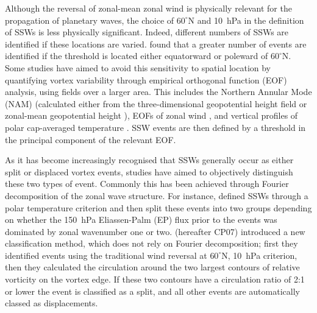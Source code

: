 Although the reversal of zonal-mean zonal wind is physically relevant for the
propagation of planetary waves, the choice of $60^{\circ}$N and 10~hPa in the
definition of SSWs is less physically significant. Indeed, different numbers of
SSWs are identified if these locations are varied. \citet{Butler2014a} found
that a greater number of events are identified if the threshold is located
either equatorward or poleward of $60^{\circ}$N. Some studies have aimed to
avoid this sensitivity to spatial location by quantifying vortex variability
through empirical orthogonal function (EOF) analysis, using fields over a larger
area. This includes the Northern Annular Mode (NAM) (calculated either from the
three-dimensional geopotential height field \citep{Baldwin2001a} or zonal-mean
geopotential height \citep{Baldwin2009}), EOFs of zonal wind
\citep{Limpasuvan2004}, and vertical profiles of polar cap-averaged temperature
\citep{Kuroda2004}. SSW events are then defined by a threshold in the principal
component of the relevant EOF.

As it has become increasingly recognised that SSWs generally occur as either
split or displaced vortex events, studies have aimed to objectively distinguish
these two types of event. Commonly this has been achieved through Fourier
decomposition of the zonal wave structure. For instance, \citet{Nakagawa2006}
defined SSWs through a polar temperature criterion and then split these events
into two groups depending on whether the 150~hPa Eliassen-Palm (EP) flux prior
to the events was dominated by zonal wavenumber one or two. \citet{Charlton2007}
(hereafter CP07) introduced a new classification method, which does not rely on
Fourier decomposition; first they identified events using the traditional wind
reversal at $60^{\circ}$N, 10~hPa criterion, then they calculated the circulation
around the two largest contours of relative vorticity on the vortex edge. If
these two contours have a circulation ratio of 2:1 or lower the event is
classified as a split, and all other events are automatically classed as
displacements. 

